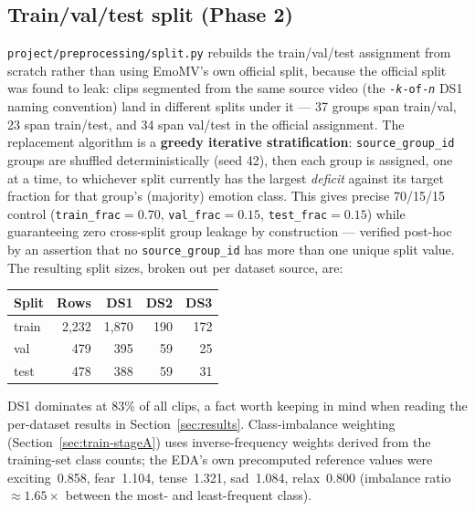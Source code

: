 \documentclass[11pt]{article}
\begin{document}
\subsection{Train/val/test split (Phase 2)}
\label{sec:split}
\texttt{project/preprocessing/split.py} rebuilds the train/val/test assignment from scratch rather
than using EmoMV's own official split, because the official split was found to leak: clips
segmented from the same source video (the \texttt{-\textit{k}-of-\textit{n}} DS1 naming
convention) land in different splits under it --- 37 groups span train/val, 23 span train/test,
and 34 span val/test in the official assignment. The replacement algorithm is a \textbf{greedy
iterative stratification}: \texttt{source\_group\_id} groups are shuffled deterministically (seed
42), then each group is assigned, one at a time, to whichever split currently has the largest
\emph{deficit} against its target fraction for that group's (majority) emotion class. This gives
precise 70/15/15 control (\texttt{train\_frac}$=0.70$, \texttt{val\_frac}$=0.15$,
\texttt{test\_frac}$=0.15$) while guaranteeing zero cross-split group leakage by construction ---
verified post-hoc by an assertion that no \texttt{source\_group\_id} has more than one unique split
value. The resulting split sizes, broken out per dataset source, are:
\begin{center}
\begin{tabular}{@{}lrrrr@{}}
\toprule
Split & Rows & DS1 & DS2 & DS3 \\
\midrule
train & 2{,}232 & 1{,}870 & 190 & 172 \\
val & 479 & 395 & 59 & 25 \\
test & 478 & 388 & 59 & 31 \\
\bottomrule
\end{tabular}
\end{center}
DS1 dominates at 83\% of all clips, a fact worth keeping in mind when reading the per-dataset
results in Section~\ref{sec:results}. Class-imbalance weighting (Section~\ref{sec:train-stageA})
uses inverse-frequency weights derived from the training-set class counts; the EDA's own
precomputed reference values were exciting~0.858, fear~1.104, tense~1.321, sad~1.084, relax~0.800
(imbalance ratio $\approx1.65\times$ between the most- and least-frequent class).
\end{document}
